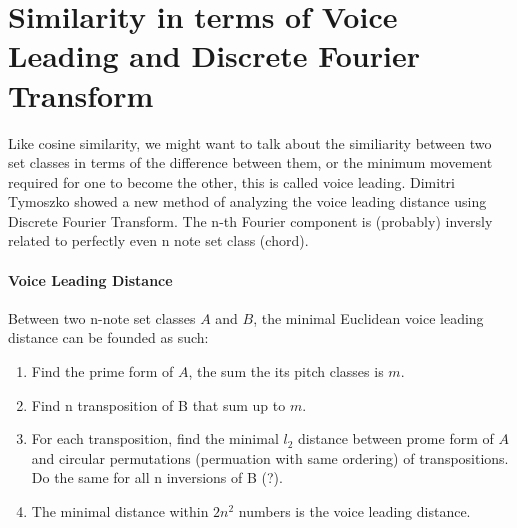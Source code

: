 \documentclass[12pt]{report}
\theoremstyle{definition}
\begin{document}
\section*{Similarity in terms of Voice Leading and Discrete Fourier Transform}
Like cosine similarity, we might want to talk about the similiarity between 
two set classes in terms of the difference between them, or the minimum movement
required for one to become the other, this is called voice leading. Dimitri Tymoszko
showed a new method of analyzing the voice leading distance using Discrete Fourier Transform.
The n-th Fourier component is (probably) inversly related to perfectly even
n note set class (chord). 
\paragraph*{Voice Leading Distance}
Between two n-note set classes $A$ and $B$, the minimal Euclidean voice leading 
distance can be founded as such:
\begin{enumerate}
    \item Find the prime form of $A$, the sum the its pitch classes is $m$.
    \item Find n transposition of B that sum up to $m$.
    \item For each transposition, find the minimal $l_2$ distance between 
    prome form of $A$ and circular permutations (permuation with same ordering)
    of transpositions. Do the same for all n inversions of B (?).
    \item The minimal distance within $2n^2$ numbers is the voice leading distance.
\end{enumerate}
\end{document}
